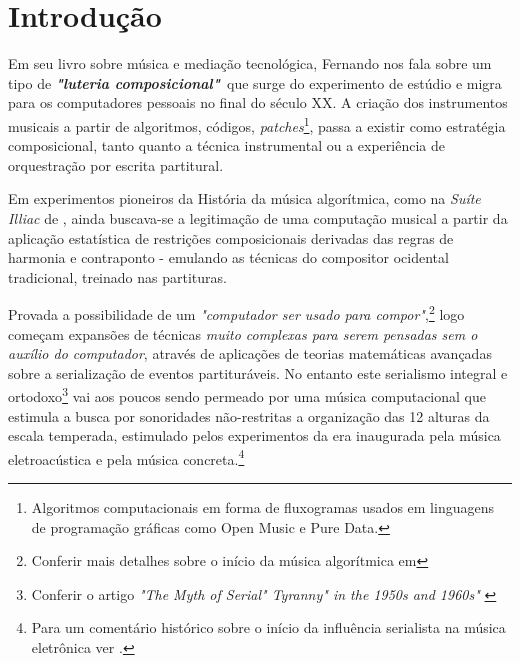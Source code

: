\documentclass[
	12pt,				%
	openright,			%
	twoside,			%
	a4paper,			%
	english,			%
	french,				%
	spanish,			%
	brazil				%
	]{abntex2}
\begin{document}
\tableofcontents*
\cleardoublepage

%
%
%
%
%
%
%
\textual




\chapter*[Introdução]{Introdução}

Em seu livro sobre música e mediação tecnológica, Fernando  nos fala sobre um tipo de \textit{\textbf{"luteria composicional"}}\ que surge do experimento de estúdio e migra para os computadores pessoais no final do século XX. A criação dos instrumentos musicais a partir de algoritmos, códigos, \textit{patches}\footnote{Algoritmos computacionais em forma de fluxogramas usados em linguagens de programação gráficas como Open Music e Pure Data.}, passa a existir como estratégia composicional, tanto quanto a técnica instrumental ou a experiência de orquestração por escrita partitural. 

Em experimentos pioneiros da História da música algorítmica, como na \textit{Suíte Illiac} de , ainda buscava-se a legitimação de uma computação musical a partir da aplicação estatística de restrições composicionais derivadas das regras de harmonia e contraponto - emulando as técnicas do compositor ocidental tradicional, treinado nas partituras. 

Provada a possibilidade de um \textit{"computador ser usado para compor"},\footnote{Conferir mais detalhes sobre o início da música algorítmica em  } logo começam expansões de técnicas \textit{muito complexas para serem pensadas sem o auxílio do computador}, através de aplicações de teorias matemáticas avançadas sobre a serialização de eventos partituráveis. No entanto este serialismo integral e ortodoxo\footnote{Conferir o artigo \textit{"The Myth of Serial" Tyranny" in the 1950s and 1960s"} \cite{straus1999myth}} vai aos poucos sendo permeado por uma música computacional que estimula a busca por sonoridades não-restritas a organização das 12 alturas da escala temperada, estimulado pelos experimentos da era inaugurada pela música eletroacústica e pela música concreta.\footnote{Para um comentário histórico sobre o início da influência serialista na música eletrônica ver . } 
\end{document}
